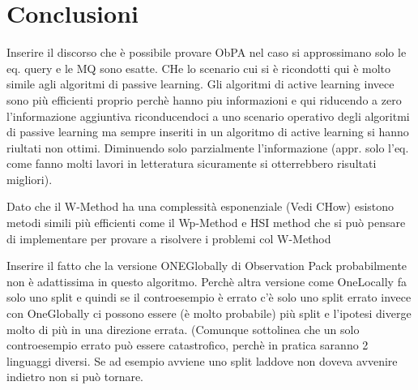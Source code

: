 \chapter*{Conclusioni}
\label{cap:con}

Inserire il discorso che è possibile provare ObPA nel caso si approssimano solo le eq. query e le MQ sono esatte. CHe lo scenario cui si è ricondotti qui è molto simile agli algoritmi di passive learning. Gli algoritmi di active learning invece sono più efficienti proprio perchè hanno piu informazioni e qui riducendo a zero l'informazione aggiuntiva riconducendoci a uno scenario operativo degli algoritmi di passive learning ma sempre inseriti in un algoritmo di active learning si hanno riultati non ottimi. Diminuendo solo parzialmente l'informazione (appr. solo l'eq. come fanno molti lavori in letteratura sicuramente si otterrebbero risultati migliori).

Dato che il W-Method ha una complessità esponenziale (Vedi CHow) esistono metodi simili più efficienti come il Wp-Method e HSI method che si può pensare di implementare per provare a risolvere i problemi col W-Method

Inserire il fatto che la versione ONEGlobally di Observation Pack probabilmente non è adattissima in questo algoritmo. Perchè altra versione come OneLocally fa solo uno split e quindi se il controesempio è errato c'è solo uno split errato invece con OneGlobally ci possono essere (è molto probabile) più split e l'ipotesi diverge molto di più in una direzione errata. (Comunque sottolinea che un solo controesempio errato può essere catastrofico, perchè in pratica saranno 2 linguaggi diversi. Se ad esempio avviene uno split laddove non doveva avvenire indietro non si può tornare.


